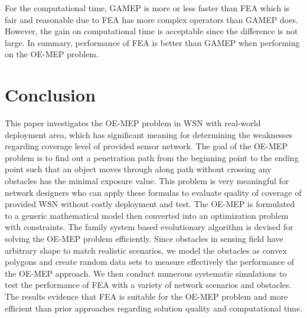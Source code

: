 \documentclass[final]{elsarticle}
\begin{document}
For the computational time, GAMEP is more or less faster than FEA which is fair and reasonable due to FEA has more complex operators than GAMEP does. However, the gain on computational time is acceptable since the difference is not large. In summary, performance of FEA is better than GAMEP when performing on the OE-MEP problem. 

\section{Conclusion}
This paper investigates the OE-MEP problem in WSN with real-world deployment area, which has significant meaning for determining the weaknesses regarding coverage level of provided sensor network. The goal of the OE-MEP problem is to find out a penetration path from the beginning point to the ending point such that an object moves through along path without crossing any obstacles has the minimal exposure value. This problem is very meaningful for network designers who can apply these formulas to evaluate quality of coverage of provided WSN without costly deployment and test. The OE-MEP is formulated to a generic mathematical model then converted into an optimization problem with constraints. The family system based evolutionary algorithm is devised for solving the OE-MEP problem efficiently. Since obstacles in sensing field have arbitrary shape to match realistic scenarios, we model the obstacles as convex polygons and create random data sets to measure effectively the performance of the OE-MEP approach. We then conduct numerous systematic simulations to test the performance of FEA with a variety of network scenarios and obstacles. The results evidence that FEA is suitable for the OE-MEP problem and more efficient than prior approaches regarding solution quality and computational time. 
\begin{landscape}

\end{landscape}

\end{document}
